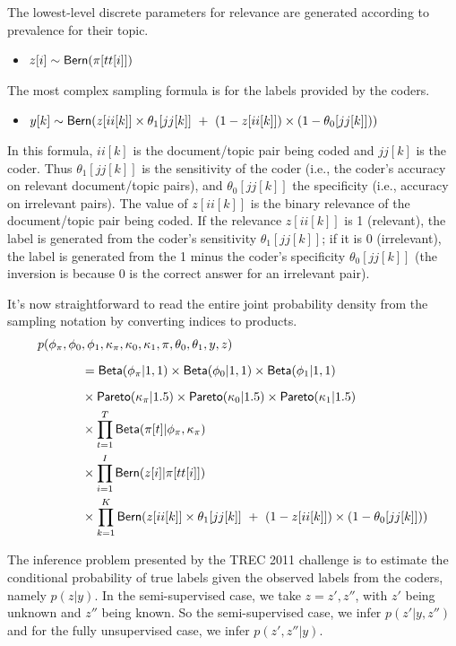\documentclass{article}
\begin{document}
The lowest-level discrete parameters for relevance are generated
according to prevalence for their topic.
%
\begin{itemize}
\item $z[i] \sim \mbox{\sf Bern}(\pi[tt[i]])$
\end{itemize}
%
The most complex sampling formula is for the labels provided
by the coders.
%
\begin{itemize}
\item $y[k] \sim \mbox{\sf Bern}(z[ii[k]] \times \theta_1[jj[k]] 
\ + \ (1 - z[ii[k]]) \times (1 - \theta_0[jj[k]]))$
\end{itemize}
%
In this formula, $ii[k]$ is the document/topic pair being coded and
$jj[k]$ is the coder.  Thus $\theta_1[jj[k]]$ is the sensitivity of
the coder (i.e., the coder's accuracy on relevant document/topic
pairs), and $\theta_0[jj[k]]$ the specificity (i.e., accuracy on
irrelevant pairs).  The value of $z[ii[k]]$ is the binary relevance of
the document/topic pair being coded.  If the relevance $z[ii[k]]$ is 1
(relevant), the label is generated from the coder's sensitivity
$\theta_1[jj[k]]$; if it is 0 (irrelevant), the label is generated
from the 1 minus the coder's specificity $\theta_0[jj[k]]$ (the
inversion is because 0 is the correct answer for an irrelevant pair).

It's now straightforward to read the entire joint probability density
from the sampling notation by converting indices to products.
%
\begin{align*}
p(\phi_{\pi},\phi_0&{},\phi_1,\kappa_{\pi},\kappa_0,\kappa_1,\pi,\theta_0,\theta_1,y,z)
\\[6pt] &{} = \mbox{\sf Beta}(\phi_{\pi}|1,1) 
     \times \mbox{\sf Beta}(\phi_0|1,1) 
     \times \mbox{\sf Beta}(\phi_1|1,1) 
\\[6pt] &{} \times \mbox{\sf Pareto}(\kappa_{\pi}|1.5)
      \times \mbox{\sf Pareto}(\kappa_0|1.5)
      \times \mbox{\sf Pareto}(\kappa_1|1.5)
\\ &{} \times \prod_{t = 1}^T \mbox{\sf Beta}(\pi[t] | \phi_{\pi}, \kappa_{\pi})
\\ &{} \times \prod_{i = 1}^I \mbox{\sf Bern}(z[i]|\pi[tt[i]])
\\ &{} \times \prod_{k = 1}^K \mbox{\sf Bern}(z[ii[k]] \times \theta_1[jj[k]] 
\ + \ (1 - z[ii[k]]) \times (1 - \theta_0[jj[k]]))
\end{align*}

The inference problem presented by the TREC 2011 challenge is
to estimate the conditional probability of true labels given the
observed labels from the coders, namely $p(z|y)$.  In the
semi-supervised case, we take $z = z', z''$, with $z'$ being
unknown and $z''$ being known.  So the semi-supervised case,
we infer $p(z'|y,z'')$ and for the fully unsupervised case,
we infer $p(z',z''|y)$.
\end{document}
